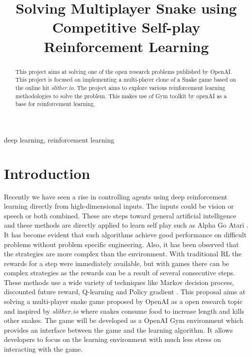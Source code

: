 \documentclass[conference,10pt]{IEEEtran}
\begin{document}
	
	\title{Solving Multiplayer Snake using Competitive Self-play Reinforcement Learning}
	
	\author{
		\and
		\and
	}
	
	\maketitle
	
	\begin{abstract}
		This project aims at solving one of the open research problems published by OpenAI\cite{n3}. This project is focused on implementing a multi-player clone of a Snake game based on the online hit \textit{slither.io}. The project aims to explore various reinforcement learning methodologies to solve the problem. This makes use of Gym toolkit by openAI as a base for reinforcement learning.
	\end{abstract}
	
	\begin{IEEEkeywords}
		deep learning, reinforcement learning
	\end{IEEEkeywords}
	
	\section{Introduction}
	Recently we have seen a rise in controlling agents using deep reinforcement learning directly from high-dimensional inputs. The inputs could be vision or speech or both combined. These are steps toward
	general artificial intelligence and these methods are directly applied to
	learn self play such as Alpha Go \cite{sp9} Atari \cite{sp3}. It has become
	evident that such algorithms achieve good performance on difficult problems
	without problem specific engineering. Also, it has been observed that the
	strategies are more complex than the environment. With traditional RL the
	rewards for a step were immediately available, but with games there can be
	complex strategies as the rewards can be a result of several consecutive steps.
	These methods use a wide variety of techniques like Markov decision process,
	discounted future reward, Q-learning \cite{sd5} and Policy gradient \cite{sd4}.\break
	This proposal aims at solving a multi-player snake game proposed by OpenAI as a open research topic and inspired by
	\textit{slither.io} \cite{sd2} where snakes consume food to increase length and
	kills other snakes. The game will be developed as a
	OpenAI Gym \cite{sd2} environment which provides an interface between the game
	and the learning algorithm. It allows developers to focus on the learning
	environment with much less stress on interacting with the game.
	
\end{document}
